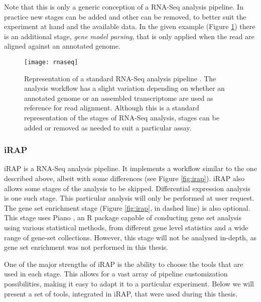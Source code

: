 Note that this is only a generic conception of a RNA-Seq analysis pipeline. In
practice new stages can be added and other can be removed, to better suit the
experiment at hand and the available data. In the given example (Figure
\ref{fig:rnaseq}) there is an additional stage, \emph{gene model parsing}, that
is only applied when the read are aligned against an annotated genome.

\begin{figure}[!htb]
  \begin{center}
    \leavevmode
    \texttt{[image: rnaseq]}
    \caption[Representation of a standard RNA-Seq analysis pipeline]{
      Representation of a standard RNA-Seq analysis pipeline
      \cite{rnaseqpipeline}. The analysis workflow has a slight variation
      depending on whether an annotated genome or an assembled transcriptome are
      used as reference for read alignment. Although this is a standard
      representation of the stages of RNA-Seq analysis, stages can be added or
      removed as needed to suit a particular assay.
    }
    \label{fig:rnaseq}
  \end{center}
\end{figure}


\subsubsection*{iRAP}

iRAP is a RNA-Seq analysis pipeline. It implements a workflow similar to the one
described above, albeit with some differences (see Figure \ref{fig:irap}). iRAP
also allows some stages of the analysis to be skipped. Differential expression
analysis is one such stage. This particular analysis will only be performed at
user request. The gene set enrichment stage (Figure \ref{fig:irap}, in dashed
line) is also optional. This stage uses Piano \cite{varemo01042013}, an R
package capable of conducting gene set analysis using various statistical
methods, from different gene level statistics and a wide range of gene-set
collections. However, this stage will not be analysed in-depth, as gene set
enrichment was not performed in this thesis.

One of the major strengths of iRAP is the ability to choose the tools that are
used in each stage. This allows for a vast array of pipeline customization
possibilities, making it easy to adapt it to a particular experiment. Below we
will present a set of tools, integrated in iRAP, that were used during this
thesis.

